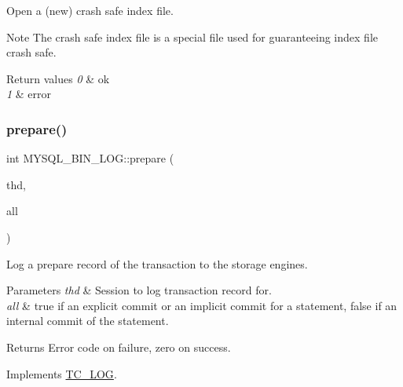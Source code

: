 Open a (new) crash safe index file.

\begin{DoxyNote}{Note}
The crash safe index file is a special file used for guaranteeing index file crash safe. 
\end{DoxyNote}

\begin{DoxyRetVals}{Return values}
{\em 0} & ok \\
\hline
{\em 1} & error \\
\hline
\end{DoxyRetVals}
\mbox{\label{group__Binary__Log_ga4789039161947fff76fa8250b120b7e3}} 
\subsubsection{\texorpdfstring{prepare()}{prepare()}}
{\footnotesize\ttfamily int M\+Y\+S\+Q\+L\+\_\+\+B\+I\+N\+\_\+\+L\+O\+G\+::prepare (\begin{DoxyParamCaption}\item[{T\+HD $\ast$}]{thd,  }\item[{bool}]{all }\end{DoxyParamCaption})\hspace{0.3cm}{\ttfamily [virtual]}}

Log a prepare record of the transaction to the storage engines.


\begin{DoxyParams}{Parameters}
{\em thd} & Session to log transaction record for.\\
\hline
{\em all} & {\ttfamily true} if an explicit commit or an implicit commit for a statement, {\ttfamily false} if an internal commit of the statement.\\
\hline
\end{DoxyParams}
\begin{DoxyReturn}{Returns}
Error code on failure, zero on success. 
\end{DoxyReturn}


Implements \mbox{\hyperlink{classTC__LOG_ab968f1e200f370127c3dcd0302d00968}{T\+C\+\_\+\+L\+OG}}.

\mbox{\label{group__Binary__Log_gaff1889360685bd90b1d3ffba10ba3dba}} 
